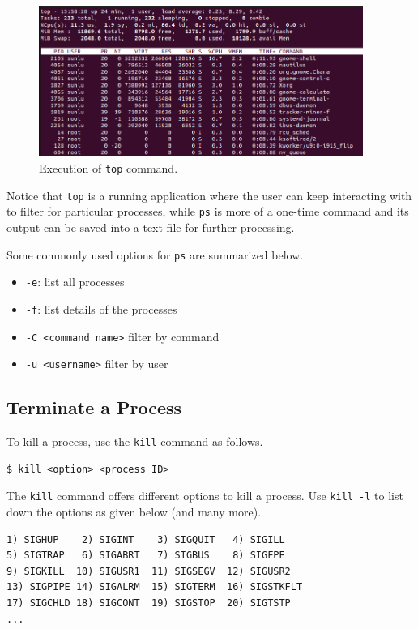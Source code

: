 \begin{figure}[!htb]
	\centering
	\includegraphics[width=300pt]{chapters/part-1/figures/topcommand.png}
	\caption{Execution of \texttt{top} command.} \label{ch:pm:fig:topcommand}
\end{figure}

Notice that \verb|top| is a running application where the user can keep interacting with to filter for particular processes, while \verb|ps| is more of a one-time command and its output can be saved into a text file for further processing.

Some commonly used options for \verb|ps| are summarized below.
\begin{itemize}
	\item \verb|-e|: list all processes
	\item \verb|-f|: list details of the processes
	\item \verb|-C <command name>| filter by command
	\item \verb|-u <username>| filter by user
\end{itemize}

\subsection{Terminate a Process}

To kill a process, use the \verb|kill| command as follows.
\begin{lstlisting}
$ kill <option> <process ID>
\end{lstlisting}

The \verb|kill| command offers different options to kill a process. Use \verb|kill -l| to list down the options as given below (and many more).
\begin{lstlisting}
1) SIGHUP    2) SIGINT    3) SIGQUIT   4) SIGILL
5) SIGTRAP   6) SIGABRT   7) SIGBUS    8) SIGFPE
9) SIGKILL  10) SIGUSR1  11) SIGSEGV  12) SIGUSR2
13) SIGPIPE 14) SIGALRM	 15) SIGTERM  16) SIGSTKFLT
17) SIGCHLD 18) SIGCONT	 19) SIGSTOP  20) SIGTSTP
...
\end{lstlisting}

